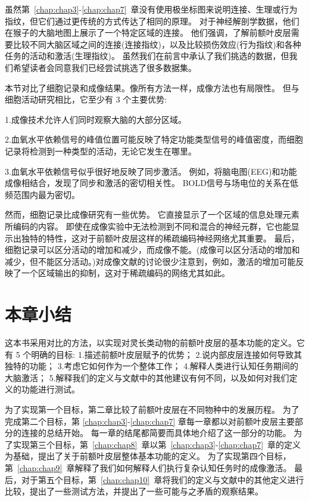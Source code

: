 虽然第~\ref{chap:chap3}-\ref{chap:chap7}~章没有使用极坐标图来说明连接、生理或行为指纹，但它们通过更传统的方式传达了相同的原理。
对于神经解剖学数据，他们在猴子的大脑地图上展示了一个特定区域的连接。
他们强调，了解前额叶皮层需要比较不同大脑区域之间的连接(连接指纹)，以及比较损伤效应(行为指纹)和各种任务的活动和激活(生理指纹)。
虽然我们在前言中承认了我们挑选的数据，但我们希望读者会同意我们已经尝试挑选了很多数据集。


\par
本节对比了细胞记录和成像结果。像所有方法一样，成像方法也有局限性。
但与细胞活动研究相比，它至少有 3 个主要优势:
\par 1.成像技术允许人们同时观察大脑的大部分区域。
\par 2.血氧水平依赖信号的峰值位置可能反映了特定功能类型信号的峰值密度，而细胞记录将检测到一种类型的活动，无论它发生在哪里。
\par 3.血氧水平依赖信号似乎很好地反映了同步激活。
例如，将脑电图(EEG)和功能成像相结合\cite{parkes2006combining}，发现了同步和激活的密切相关性。
BOLD信号与场电位的关系在低频范围内最为密切\cite{kayser2004comparison}。


\par 然而，细胞记录比成像研究有一些优势。
它直接显示了一个区域的信息处理元素所编码的内容。
即使在成像实验中无法检测到不同和混合的神经元群，它也能显示出独特的特性，这对于前额叶皮层这样的稀疏编码神经网络尤其重要。
最后，细胞记录可以区分活动的增加和减少，而成像不能。(成像可以区分活动的增加和减少，但不能区分活动。)对成像文献的讨论很少注意到，例如，激活的增加可能反映了一个区域输出的抑制，这对于稀疏编码的网络尤其如此。


\section{本章小结}

这本书采用对比的方法，以实现对灵长类动物的前额叶皮层的基本功能的定义。它有 5 个明确的目标:
1.描述前额叶皮层赋予的优势；
2.说内部皮层连接如何导致其独特的功能；
3.考虑它如何作为一个整体工作；
4.解释人类进行认知任务期间的大脑激活；
5.解释我们的定义与文献中的其他建议有何不同，以及如何对我们定义的功能进行测试。


\par

为了实现第一个目标，第二章比较了前额叶皮层在不同物种中的发展历程。
为了完成第二个目标，第 \ref{chap:chap3}-\ref{chap:chap7} 章每一章都以对前额叶皮层主要部分的连接的总结开始。
每一章的结尾都简要而具体地介绍了这一部分的功能。
为了实现第三个目标，第~\ref{chap:chap8}~章以第~\ref{chap:chap3}-\ref{chap:chap7}~章的定义为基础，提出了关于前额叶皮层整体基本功能的定义。
为了实现第四个目标，第~\ref{chap:chap9}~章解释了我们如何解释人们执行复杂认知任务时的成像激活。
最后，对于第五个目标，第~\ref{chap:chap10}~章将我们的定义与文献中的其他定义进行比较，提出了一些测试方法，并提出了一些可能与之矛盾的观察结果。



